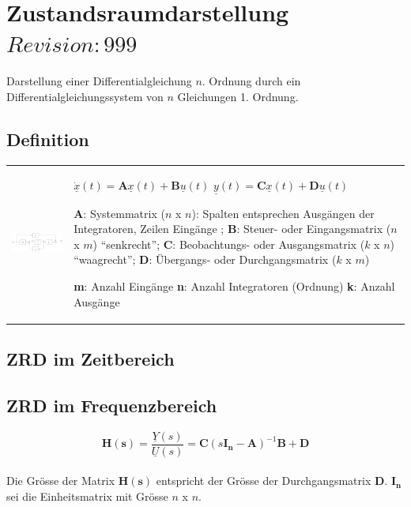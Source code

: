 \section{Zustandsraumdarstellung  \tiny{$Revision: 999 $}}
Darstellung einer Differentialgleichung $n$. Ordnung durch ein
Differentialgleichungssystem von $n$ Gleichungen 1. Ordnung.

\subsection{Definition }
\begin{tabular}{ll}
\parbox{10cm}{
	\includegraphics[width=10cm]{./bilder/zrd-schema.png}
	}
	& \parbox{8cm}{
		$\dot{\underline{x}}(t) = {\boldsymbol A} \underline{x}(t) + {\boldsymbol B}
		\underline{u}(t)$ \\
		$\underline{y}(t) = {\boldsymbol C} \underline{x}(t) + {\boldsymbol D}
		\underline{u}(t)$\\ 
		
		${\boldsymbol A}$: Systemmatrix ($n$ x $n$): Spalten entsprechen Ausgängen
		der Integratoren, Zeilen Eingänge ; \\ 
		${\boldsymbol B}$: Steuer- oder
		Eingangsmatrix ($n$ x $m$) ``senkrecht''; \\ ${\boldsymbol C}$: Beobachtungs- oder Ausgangsmatrix ($k$ x $n$)
		``waagrecht''; \\
		${\boldsymbol D}$: Übergangs- oder Durchgangsmatrix ($k$ x
		$m$)\\
		
		\textbf{m}: Anzahl Eingänge \\
		\textbf{n}: Anzahl Integratoren (Ordnung) \\
		\textbf{k}: Anzahl Ausgänge
	}
 \end{tabular}

\subsection{ZRD im Zeitbereich }

\subsection{ZRD im Frequenzbereich  }
$$\boldsymbol{H(s)} = \frac{\underline{Y}(s)}{\underline{U}(s)} =
\boldsymbol{C}\left(s\boldsymbol{I_n}-\boldsymbol{A}\right)^{-1}\boldsymbol{B}+\boldsymbol{D}$$
\\
Die Grösse der Matrix $\boldsymbol {H(s)}$ entspricht der Grösse der
Durchgangsmatrix $\boldsymbol D$. $\boldsymbol{I_n}$ sei die Einheitsmatrix mit
Grösse $n$ x $n$.

